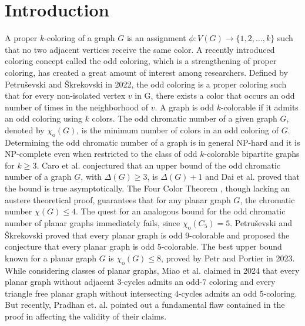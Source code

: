 \documentclass[12pt,a4paper]{article}
\theoremstyle{definition}
\numberwithin{equation}{section}
\begin{document}
\section{Introduction}
A proper $k$-coloring of a graph $G$ is an assignment $\phi: V(G) \rightarrow \{1,2,\ldots,k\}$ such that no two adjacent vertices receive the same color. A recently introduced coloring concept called the odd coloring, which is a strengthening of proper coloring, has created a great amount of interest among researchers. Defined by Petruševski and Škrekovski \cite{Pet} in 2022, the odd coloring is a proper coloring such that for every non-isolated vertex $v$ in G, there exists a color that occurs an odd number of times in the neighborhood of $v$. A graph is odd $k$-colorable if it admits an odd coloring using $k$ colors. The odd chromatic number of a given graph $G$, denoted by $\chi_{\text{o}}(G)$, is the minimum number of colors in an odd coloring of $G$. Determining the odd chromatic number of a graph is in general NP-hard \cite{Caro 2} and it is NP-complete \cite{Ahn} even when restricted to the class of odd $k$-colorable bipartite graphs for $k\geq 3$. Caro et al.\cite{Caro 2} conjectured that an upper bound of the odd chromatic number of a graph $G$, with $\Delta(G) \geq 3$, is $\Delta(G)+1$ and Dai et al. \cite{Dai} proved that the bound is true asymptotically. The Four Color Theorem \cite{App, Rob}, though lacking an austere theoretical proof, guarantees that for any planar graph $G$, the chromatic number $\chi(G) \leq 4$. The quest for an analogous bound for the odd chromatic number of planar graphs immediately fails, since $\chi_{\text{o}}(C_5) =5$. Petruševski and Škrekovski \cite{Pet} proved that every planar graph is odd $9$-colorable and proposed the conjecture that every planar graph is odd $5$-colorable. The best upper bound known for a planar graph $G$ is $\chi_{\text{o}}(G) \leq 8$, proved by Petr and Portier \cite{Petr} in 2023. While considering classes of planar graphs, Miao et al. \cite{Miao} claimed in 2024 that every planar graph without adjacent $3$-cycles admits an odd-$7$ coloring and every triangle free planar graph without intersecting $4$-cycles admits an odd $5$-coloring. But recently, Pradhan et. al. \cite{Prad} pointed out a fundamental flaw contained in the proof in \cite{Miao} affecting the validity of their claims.\par
\end{document}
